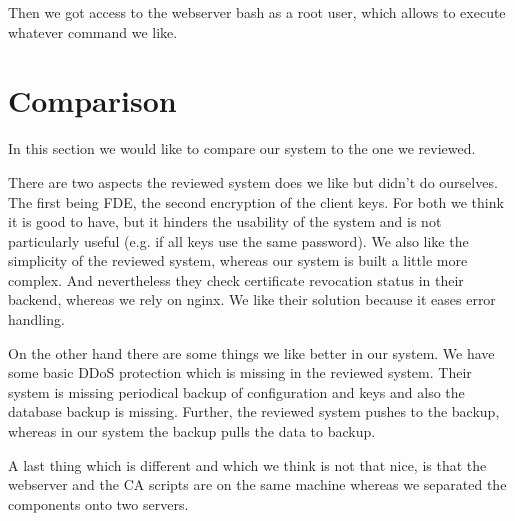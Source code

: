 \documentclass[english]{article}
\begin{document}
Then we got access to the webserver bash as a root user, which allows to execute whatever command we like.

\section{Comparison} %

In this section we would like to compare our system to the one we reviewed.

There are two aspects the reviewed system does we like but didn't do ourselves. The first being FDE, the second encryption of the client keys. For both we think it is good to have, but it hinders the usability of the system and is not particularly useful (e.g. if all keys use the same password). We also like the simplicity of the reviewed system, whereas our system is built a little more complex. And nevertheless they check certificate revocation status in their backend, whereas we rely on nginx. We like their solution because it eases error handling.

On the other hand there are some things we like better in our system. We have some basic DDoS protection which is missing in the reviewed system. Their system is missing periodical backup of configuration and keys and also the database backup is missing. Further, the reviewed system pushes to the backup, whereas in our system the backup pulls the data to backup.

A last thing which is different and which we think is not that nice, is that the webserver and the CA scripts are on the same machine whereas we separated the components onto two servers.


\end{document}
